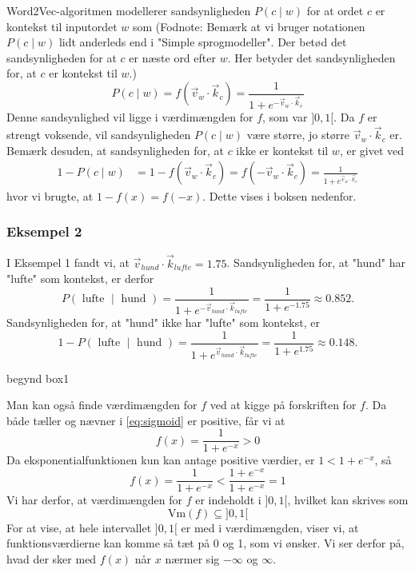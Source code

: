 \documentclass{article}
\newcommand{\am}[1]{{\color{red} #1}}
\begin{document}
Word2Vec-algoritmen modellerer sandsynligheden $P(c\mid w)$ for at ordet $c$ er kontekst til inputordet $w$ som (Fodnote: Bemærk at vi bruger notationen $P(c\mid w)$ lidt anderleds end i "Simple sprogmodeller". Der betød det sandsynligheden for at $c$ er næste ord efter $w$. Her betyder det sandsynligheden for, at $c$ er kontekst til $w$.)
\begin{equation}\label{eq:pcw}
P(c\mid w) = f(\overrightarrow{v}_{w} \cdot \overrightarrow{k}_{c})=\frac{1}{1+e^{-\overrightarrow{v}_{w} \cdot \overrightarrow{k}_{c}}}
\end{equation}
Denne sandsynlighed vil ligge i værdimængden for $f$, som var $]0,1[$. Da $f$ er strengt voksende, vil sandsynligheden $P(c \mid w)$ være større, jo større $\overrightarrow{v}_{w} \cdot \overrightarrow{k}_{c}$ er. Bemærk desuden, at sandsynligheden for, at $c$ ikke er kontekst til $w$, er givet ved 
\begin{align}\label{eq:pneg}
1-P(c\mid w) &= 1-f(\overrightarrow{v}_{w} \cdot \overrightarrow{k}_{c}) = f(-\overrightarrow{v}_{w} \cdot \overrightarrow{k}_{c})
= \frac{1}{1+e^{\overrightarrow{v}_{w} \cdot \overrightarrow{k}_{c}}}
\end{align}
hvor vi brugte, at $1-f(x)=f(-x)$. Dette vises i boksen nedenfor.

\subsubsection*{Eksempel 2}
I Eksempel 1 fandt vi, at $\overrightarrow{v}_{hund} \cdot \overrightarrow{k}_{lufte} = 1.75$. Sandsynligheden for, at "hund" har "lufte" som kontekst, er derfor 
$$P(\text{ lufte } \mid \text{ hund }) = \frac{1}{1+e^{-\overrightarrow{v}_{hund} \cdot \overrightarrow{k}_{lufte}}}=\frac{1}{1+e^{-1.75}} \approx  0.852.$$
Sandsynligheden for, at 
"hund" ikke har "lufte" som kontekst, er 
$$1- P(\text{ lufte } \mid \text{ hund }) = \frac{1}{1+e^{\overrightarrow{v}_{hund} \cdot \overrightarrow{k}_{lufte}}}=\frac{1}{1+e^{1.75}} \approx 0.148.$$

\am{begynd box1}

 Man kan også finde værdimængden for $f$ ved at kigge på forskriften for $f$. Da både tæller og nævner i \eqref{eq:sigmoid} er positive, får vi at 
$$f(x)=\frac{1}{1+e^{-x}}>0$$
Da eksponentialfunktionen kun kan antage positive værdier, er $1<1+e^{-x}$, så
$$ f(x)=\frac{1}{1+e^{-x}}< \frac{1+e^{-x}}{1+e^{-x}} =1$$
Vi har derfor, at værdimængden for $f$ er indeholdt i $]0,1[$, hvilket kan skrives som
$$\text{Vm}(f) \subseteq ]0,1[$$
For at vise, at hele intervallet $]0,1[$ er med i værdimængden, viser vi, at funktionsværdierne kan komme så tæt på 0 og 1, som vi ønsker. 
Vi ser derfor på, hvad der sker med $f(x) $ når $x$ nærmer sig $-\infty$ og $\infty$. 
\end{document}
